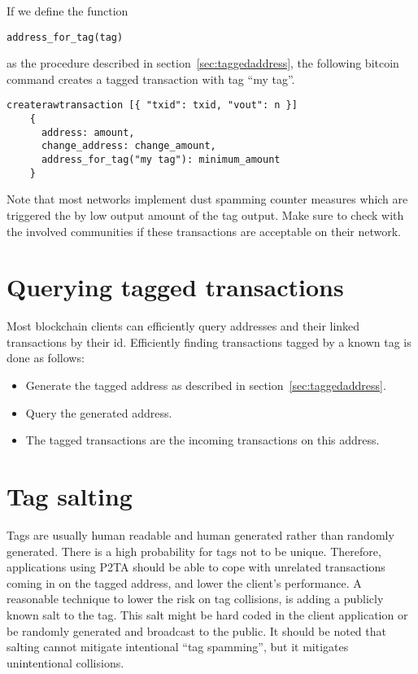 \documentclass[a4paper,10pt]{article}
\begin{document}
If we define the function \begin{small}\verb|address_for_tag(tag)|\end{small} as the procedure described in section~\ref{sec:taggedaddress}, the following bitcoin command creates a tagged transaction with tag ``my tag''.
\begin{small}\begin{verbatim}
createrawtransaction [{ "txid": txid, "vout": n }]
    {
      address: amount,
      change_address: change_amount,
      address_for_tag("my tag"): minimum_amount
    }
\end{verbatim}\end{small}
Note that most networks implement dust spamming counter measures which are triggered the by low output amount of the tag output.
Make sure to check with the involved communities if these transactions are acceptable on their network.


\section{Querying tagged transactions}
Most blockchain clients can efficiently query addresses and their linked transactions by their id.
Efficiently finding transactions tagged by a known tag is done as follows:
\begin{itemize}
 \item Generate the tagged address as described in section~\ref{sec:taggedaddress}.
 \item Query the generated address.
 \item The tagged transactions are the incoming transactions on this address.
\end{itemize}


\section{Tag salting}
Tags are usually human readable and human generated rather than randomly generated.
There is a high probability for tags not to be unique.
Therefore, applications using P2TA should be able to cope with unrelated transactions coming in on the tagged address, and lower the client's performance.
A reasonable technique to lower the risk on tag collisions, is adding a publicly known salt to the tag.
This salt might be hard coded in the client application or be randomly generated and broadcast to the public.
It should be noted that salting cannot mitigate intentional ``tag spamming'', but it mitigates unintentional collisions.
\end{document}
